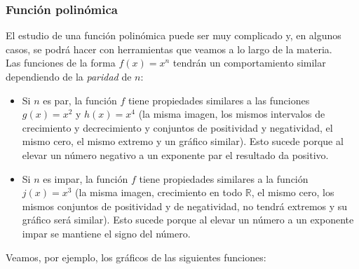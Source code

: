 \documentclass[Análisis.root.tex]{subfiles}
\newcommand{\R}{\mathbb{R}}
\begin{document}
        \subsubsection{Función polinómica}
        El estudio de una función polinómica puede ser muy complicado y, en algunos casos, se podrá hacer con herramientas que veamos a lo largo de la materia.\\
        Las funciones de la forma \(f(x) = x^n\) tendrán un comportamiento similar dependiendo de la \textit{paridad} de \(n\):
        \begin{itemize}
            \item Si \(n\) es par, la función \(f\) tiene propiedades similares a las funciones \(g(x) = x^2\) y \(h(x) = x^4\) (la misma imagen, los mismos intervalos de crecimiento y decrecimiento y conjuntos de positividad y negatividad, el mismo cero, el mismo extremo y un gráfico similar). Esto sucede porque al elevar un número negativo a un exponente par el resultado da positivo.
            \item Si \(n\) es impar, la función \(f\) tiene propiedades similares a la función \(j(x) = x^3\) (la misma imagen, crecimiento en todo \(\R\), el mismo cero, los mismos conjuntos de positividad y de negatividad, no tendrá extremos y su gráfico será similar). Esto sucede porque al elevar un número a un exponente impar se mantiene el signo del número.
        \end{itemize}
        Veamos, por ejemplo, los gráficos de las siguientes funciones:
\end{document}
